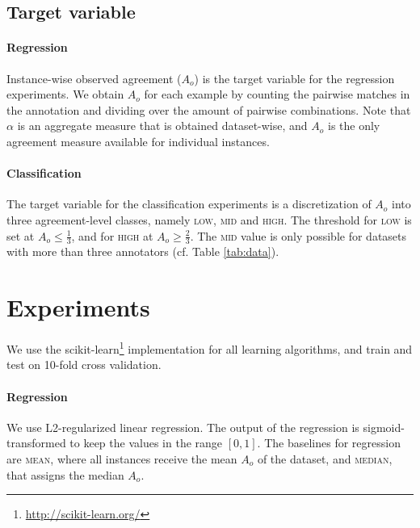 \documentclass[11pt,a4paper]{article}
\begin{document}
\subsection{Target variable}
\label{sec:targetvariable}
\paragraph*{Regression} Instance-wise observed agreement ($A_o$) is the target variable for the regression experiments. We obtain  $A_o$ for each example by counting the pairwise matches in the annotation and dividing over the amount of pairwise combinations. 
Note that  $\alpha$ is an aggregate measure that is obtained dataset-wise, and $A_o$ is the only agreement measure available for individual instances.

\paragraph*{Classification} The target variable for the classification experiments is a discretization of $A_o$ into three agreement-level classes, namely \textsc{low}, \textsc{mid} and \textsc{high}. The threshold for \textsc{low} is set at $A_o \le \frac{1}{3}$, and for \textsc{high} at $A_o \ge \frac{2}{3}$. The \textsc{mid} value is only possible for datasets with more than three annotators (cf. Table \ref{tab:data}).



\section{Experiments}
We use the scikit-learn\footnote{\url{http://scikit-learn.org/}} implementation for all learning algorithms, and train and test on 10-fold cross validation.
\paragraph{Regression} We use L2-regularized linear regression. The output of the regression is sigmoid-transformed to keep the values in the range $[0,1]$. The baselines for regression are \textsc{mean}, where all instances receive the mean $A_o$ of the dataset, and  \textsc{median}, that assigns the median $A_o$. 
\end{document}
